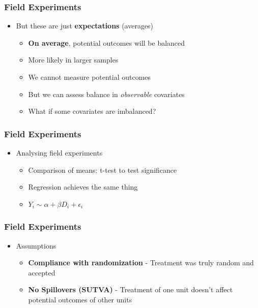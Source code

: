 \documentclass[xcolor=x11names,compress]{beamer}\usepackage[]{graphicx}\usepackage[]{color}
\renewcommand{\(}{\begin{columns}}
\renewcommand{\)}{\end{columns}}
\newcommand{\<}[1]{\begin{column}{#1}}
\renewcommand{\>}{\end{column}}
\begin{document}
\begin{frame}
\frametitle{Field Experiments}
\begin{itemize}
\item But these are just \textbf{expectations} (averages)
\pause
\begin{itemize}
\item \textbf{On average}, potential outcomes will be balanced
\pause
\item More likely in larger samples
\pause
\item We cannot measure potential outcomes
\pause
\item But we can assess balance in \textit{observable} covariates
\pause
\item What if some covariates are imbalanced? %
\end{itemize}
\end{itemize}
\end{frame}

\begin{frame}
\frametitle{Field Experiments}
\begin{itemize}
\item Analysing field experiments
\begin{itemize}
\item Comparison of means: t-test to test significance
\item Regression achieves the same thing
\item $Y_i \sim \alpha + \beta D_i + \epsilon_i$ 
\end{itemize}
\end{itemize}
\end{frame}

\begin{frame}
\frametitle{Field Experiments}
\begin{itemize}
\item Assumptions
\begin{itemize}
\item \textbf{Compliance with randomization} - Treatment was truly random and accepted
\item \textbf{No Spillovers (SUTVA)} - Treatment of one unit doesn't affect potential outcomes of other units
\end{itemize}
\end{itemize}
\end{frame}
\end{document}
